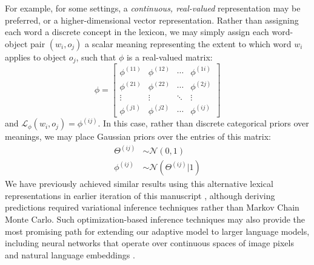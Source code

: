 \documentclass[10pt, man, floatsintext]{apa7}
\begin{document}
For example, for some settings, a \emph{continuous, real-valued} representation may be preferred, or a higher-dimensional vector representation.
Rather than assigning each word a discrete concept in the lexicon, we may simply assign each word-object pair $(w_i,o_j)$ a scalar meaning representing the extent to which word $w_i$ applies to object $o_j$, such that $\phi$ is a real-valued matrix:
$$
\phi = \begin{bmatrix}
\phi^{(11)} & \phi^{(12)} & \cdots & \phi^{(1i)} \\
\phi^{(21)} & \phi^{(22)} & \cdots & \phi^{(2j)} \\
\vdots & \vdots &\ddots & \vdots \\
\phi^{(j1)} & \phi^{(j2)} & \cdots & \phi^{(ij)} 
\end{bmatrix}
$$
and $\mathcal{L}_\phi(w_i, o_j) = \phi^{(ij)}$. 
In this case, rather than discrete categorical priors over meanings, we may place Gaussian priors over the entries of this matrix:
\begin{align}
\Theta^{(ij)} & \sim \mathcal{N}(0,1)\nonumber \\
\phi^{(ij)} & \sim \mathcal{N}(\Theta^{(ij)} | 1)\nonumber
\end{align}
We have previously achieved similar results using this alternative lexical representations in earlier iteration of this manuscript \cite{hawkins_convention-formation_2017,hawkins2020generalizing}, although deriving predictions required variational inference techniques rather than Markov Chain Monte Carlo. 
Such optimization-based inference techniques may also provide the most promising path for extending our adaptive model to larger language models, including neural networks that operate over continuous spaces of image pixels and natural language embeddings \cite{hawkins2019continual}.
\end{document}
